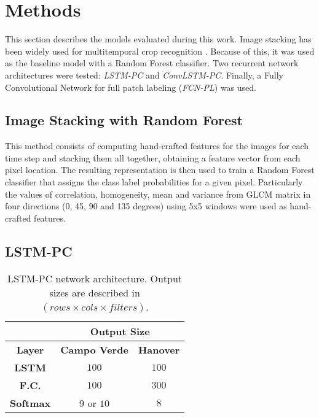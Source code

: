 

\section{Methods}


This section describes the models evaluated during this work. Image stacking has been widely used for multitemporal crop recognition \cite{schneider2012monitoring,schneider2008compact}. Because of this, it was used as the baseline model with a Random Forest classifier. Two recurrent network architectures were tested: \textit{LSTM-PC} and \textit{ConvLSTM-PC}. Finally, a Fully Convolutional Network for full patch labeling (\textit{FCN-PL}) was used.

\subsection{Image Stacking with Random Forest}

This method consists of computing hand-crafted features for the images for each time step and stacking them all together, obtaining a feature vector from each pixel location. The resulting representation is then used to train a Random Forest classifier that assigns the class label probabilities for a given pixel. Particularly the values of correlation, homogeneity, mean and variance from GLCM matrix in four directions (0, 45, 90 and 135 degrees) using 5x5 windows were used as hand-crafted features. 
\subsection{LSTM-PC}




\begin{table}[]
\centering
\caption{LSTM-PC network architecture. Output sizes are described in $(rows\times cols\times filters)$.}
\label{table:lstm}
\begin{tabular}{|c|c|c|}
\hline
\multicolumn{1}{|l|}{} & \multicolumn{2}{c|}{\textbf{Output Size}} \\ \hline
\textbf{Layer}         & \textbf{Campo Verde}  & \textbf{Hanover}  \\ \hline
\textbf{LSTM}          & $100$                 & $100$             \\ \hline
\textbf{F.C.}          & $100$                 & $300$             \\ \hline
\textbf{Softmax}       & $9$ or $10$           & $8$               \\ \hline
\end{tabular}
\end{table}

